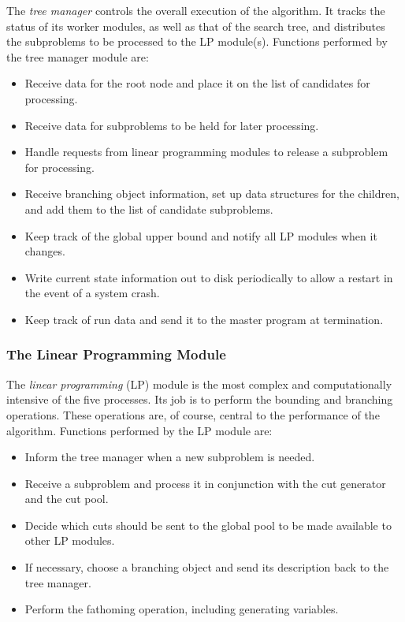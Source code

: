 The {\em tree manager} controls the overall execution of the algorithm. It
tracks the status of its worker modules, as well as that of the search
tree, and distributes the subproblems to be processed to the LP
module(s). Functions performed by the tree manager module are:
\begin{itemize}
        \item Receive data for the root node and place it on the list 
        of candidates for processing.
        \item Receive data for subproblems to be held for later
        processing.
        \item Handle requests from linear programming modules to
        release a subproblem for processing.
        \item Receive branching object information, set up data structures
        for the children, and add them to the list of candidate subproblems.
        \item Keep track of the global upper bound and notify all LP
        modules when it changes.
        \item Write current state information out to disk periodically
        to allow a restart in the event of a system crash.
        \item Keep track of run data and send it to the master
        program at termination.
\end{itemize} 

\subsubsection{The Linear Programming Module}

The {\em linear programming} (LP) module is the most complex and
computationally intensive of the five processes. Its job is to perform
the bounding and branching operations. These operations
are, of course, central to the performance of the algorithm. Functions
performed by the LP module are:
\begin{itemize}
        \item Inform the tree manager when a new subproblem is needed.
        \item Receive a subproblem and process it in conjunction
        with the cut generator and the cut pool.
        \item Decide which cuts should be sent to the global pool to
        be made available to other LP modules.
        \item If necessary, choose a branching object and send its
        description back to the tree manager.
        \item Perform the fathoming operation, including generating
        variables. 
\end{itemize} 

